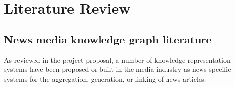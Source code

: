 \documentclass[11pt]{article}
\begin{document}







\section{Literature Review}

\label{sec:LiteratureReview}

\subsection{News media knowledge graph literature}

As reviewed in the project proposal\cite{ek-proposal}, a number of knowledge representation systems have been proposed or built in the media industry as news-specific systems for the aggregation, generation, or linking of news articles. 
\end{document}
